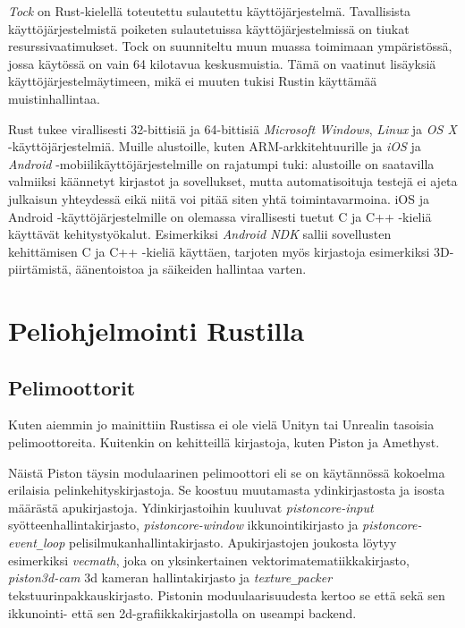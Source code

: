 \documentclass[finnish]{tktltiki2}
\theoremstyle{definition}
\theoremstyle{remark}
\begin{document}
\textit{Tock} on Rust-kielellä toteutettu sulautettu käyttöjärjestelmä.\cite{OwnershipIsTheft} Tavallisista käyttöjärjestelmistä poiketen sulautetuissa käyttöjärjestelmissä on tiukat resurssivaatimukset. Tock on suunniteltu muun muassa toimimaan ympäristössä, jossa käytössä on vain 64 kilotavua keskusmuistia. Tämä on vaatinut lisäyksiä käyttöjärjestelmäytimeen, mikä ei muuten tukisi Rustin käyttämää muistinhallintaa. %

Rust tukee virallisesti 32-bittisiä ja 64-bittisiä \textit{Microsoft Windows}, \textit{Linux} ja \textit{OS X} -käyttöjärjestelmiä.\cite{RustPlatformSupport} Muille alustoille, kuten ARM-arkkitehtuurille ja \textit{iOS} ja \textit{Android} -mobiilikäyttöjärjestelmille on rajatumpi tuki: alustoille on saatavilla valmiiksi käännetyt kirjastot ja sovellukset, mutta automatisoituja testejä ei ajeta julkaisun yhteydessä eikä niitä voi pitää siten yhtä toimintavarmoina. iOS ja Android -käyttöjärjestelmille on olemassa virallisesti tuetut C ja C++ -kieliä käyttävät kehitystyökalut. Esimerkiksi \textit{Android NDK} sallii sovellusten kehittämisen C ja C++ -kieliä käyttäen, tarjoten myös kirjastoja esimerkiksi 3D-piirtämistä, äänentoistoa ja säikeiden hallintaa varten.\cite{AndroidNDK}

\section{Peliohjelmointi Rustilla}

\subsection{Pelimoottorit}
Kuten aiemmin jo mainittiin Rustissa ei ole vielä Unityn tai Unrealin tasoisia pelimoottoreita. Kuitenkin on kehitteillä kirjastoja, kuten Piston ja Amethyst. 

Näistä Piston täysin modulaarinen pelimoottori eli se on käytännössä kokoelma erilaisia pelinkehityskirjastoja. Se koostuu muutamasta ydinkirjastosta ja isosta määrästä apukirjastoja. Ydinkirjastoihin kuuluvat \textit{pistoncore-input} syötteenhallintakirjasto, \textit{pistoncore-window} ikkunointikirjasto ja \textit{pistoncore-event\texttt{\_}loop} pelisilmukanhallintakirjasto. Apukirjastojen joukosta löytyy esimerkiksi \textit{vecmath}, joka on yksinkertainen vektorimatematiikkakirjasto, \textit{piston3d-cam} 3d kameran hallintakirjasto ja \textit{texture\texttt{\_}packer} tekstuurinpakkauskirjasto. Pistonin moduulaarisuudesta kertoo se että sekä sen ikkunointi- että sen 2d-grafiikkakirjastolla on useampi backend.  
\end{document}
